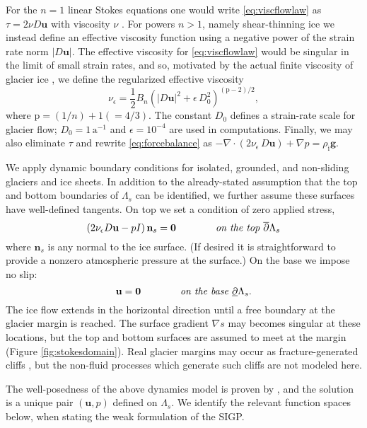 \documentclass[letterpaper,final,12pt,reqno]{amsart}
\theoremstyle{claim}
\newcommand{\eps}{\epsilon}
\newcommand{\grad}{\nabla}
\newcommand{\bn}{\mathbf{n}}
\newcommand{\bu}{\mathbf{u}}
\newcommand{\bzero}{\bm{0}}
\newcommand{\rhoi}{\rho_{\text{i}}}
\newcommand{\pp}{{\text{p}}}
\numberwithin{equation}{section}
\numberwithin{figure}{section}
\numberwithin{table}{section}
\numberwithin{theorem}{section}
\begin{document}
For the $n=1$ linear Stokes equations one would write \eqref{eq:viscflowlaw} as $\tau = 2\nu D\bu$ with viscosity $\nu$ \cite[for example]{Elmanetal2014}.  For powers $n>1$, namely shear-thinning ice we instead define an effective viscosity function using a negative power of the strain rate norm $|D\bu|$.  The effective viscosity for \eqref{eq:viscflowlaw} would be singular in the limit of small strain rates, and so, motivated by the actual finite viscosity of glacier ice \cite{GreveBlatter2009}, we define the regularized effective viscosity
\begin{equation}
\nu_\eps = \frac{1}{2} B_n \left(|D\bu|^2 + \eps\, D_0^2\right)^{(\pp-2)/2}, \label{eq:regeffvisc}
\end{equation}
where $\pp=(1/n)+1(=4/3)$.  The constant $D_0$ defines a strain-rate scale for glacier flow; $D_0 = 1 \,\text{a}^{-1}$ and $\eps = 10^{-4}$ are used in computations.  Finally, we may also eliminate $\tau$ and rewrite \eqref{eq:forcebalance} as $- \nabla \cdot \left(2 \nu_\eps\, D\bu\right) + \nabla p = \rhoi \mathbf{g}$.

We apply dynamic boundary conditions for isolated, grounded, and non-sliding glaciers and ice sheets.  In addition to the already-stated assumption that the top and bottom boundaries of $\Lambda_s$ can be identified, we further assume these surfaces have well-defined tangents.  On top we set a condition of zero applied stress,
\begin{equation}
\left(2 \nu_\eps D\bu - pI\right) \bn_s = \bzero  \qquad \qquad \text{\emph{on the top} } \overline{\partial} \Lambda_s \label{eq:topbc}
\end{equation}
where $\bn_s$ is any normal to the ice surface.  (If desired it is straightforward to provide a nonzero atmospheric pressure at the surface.)  On the base we impose no slip:
\begin{equation}
\bu = \bzero  \qquad\qquad \text{\emph{on the base} } \underline{\partial} \Lambda_s. \label{eq:basebc}
\end{equation}
The ice flow extends in the horizontal direction until a free boundary at the glacier margin is reached.  The surface gradient $\grad s$ may becomes singular at these locations, but the top and bottom surfaces are assumed to meet at the margin (Figure \ref{fig:stokesdomain}).  Real glacier margins may occur as fracture-generated cliffs \cite{PralongFunk2005}, but the non-fluid processes which generate such cliffs are not modeled here.

The well-posedness of the above dynamics model is proven by \cite{JouvetRappaz2011}, and the solution is a unique pair $(\bu,p)$ defined on $\Lambda_s$.  We identify the relevant function spaces below, when stating the weak formulation of the SIGP.
\end{document}
